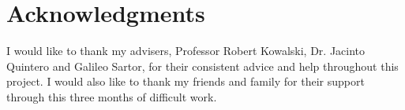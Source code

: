 \documentclass[12pt,twoside]{report}
\date{September 2022}
\begin{document}





\section*{Acknowledgments}
I would like to thank my advisers, Professor Robert Kowalski, Dr. Jacinto Quintero and Galileo Sartor, for their consistent advice and help throughout this project. I would also like to thank my friends and family for their support through this three months of difficult work.




\tableofcontents


%


\newpage
%

\newpage
%

\newpage

%

\newpage
%

\newpage
%

\newpage
%

\newpage


\newpage


\newpage
%

\newpage
%

\newpage
%
% 
%

\end{document}

